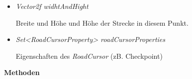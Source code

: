 \begin{itemize}
                \item  \textit{Vector2f widhtAndHight}
                    \begin{leftbar}[0.9\linewidth]
                        Breite und Höhe und Höhe der Strecke in diesem Punkt.
                    \end{leftbar}
                \item  \textit{Set<RoadCursorProperty> roadCursorProperties}
                    \begin{leftbar}[0.9\linewidth]
                        Eigenschaften des \textit{RoadCursor} (zB. Checkpoint)
                    \end{leftbar}
            

            \end{itemize}

        \textbf{Methoden}
